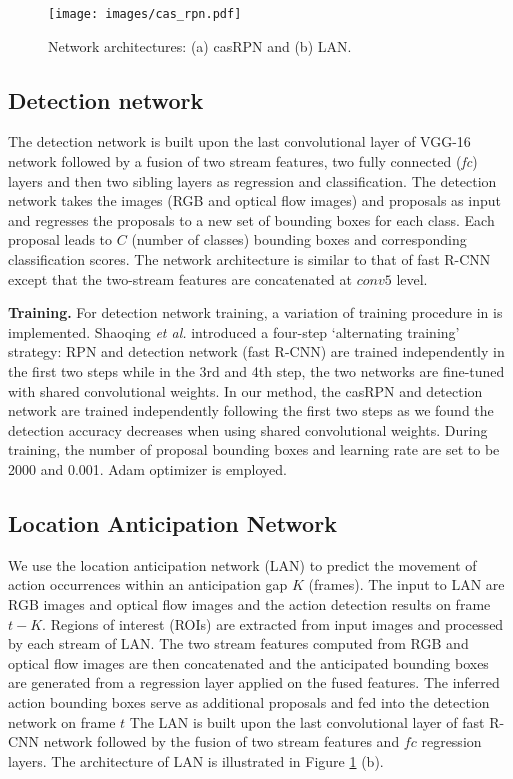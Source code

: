 \documentclass{bmvc2k}
\begin{document}
\begin{figure}
\centering
\texttt{[image: images/cas\_rpn.pdf]}
\caption{Network architectures: (a) casRPN and (b) LAN.}
\label{fig:cas_rpn}
\end{figure}

\subsection{Detection network}
The detection network is built upon the last convolutional layer of VGG-16 network \cite{simonyan2014very} followed by a fusion of two stream features, two fully connected (\textit{fc}) layers and then two sibling layers as regression and classification. The detection network takes the images (RGB and optical flow images) and proposals as input and regresses the proposals to a new set of bounding boxes for each class. Each proposal leads to $C$ (number of classes) bounding boxes and corresponding classification scores. The network architecture is similar to that of fast R-CNN \cite{girshick2015fast} except that the two-stream features are concatenated at $conv5$ level.

\textbf{Training.} For detection network training, a variation of training procedure in \cite{ren2015faster} is implemented. Shaoqing \textit{et al.} \cite{ren2015faster} introduced a four-step `alternating training' strategy: RPN and detection network (fast R-CNN) are trained independently in the first two steps while in the 3rd and 4th step, the two networks are fine-tuned with shared convolutional weights. In our method, the casRPN and detection network are trained independently following the first two steps as we found the detection accuracy decreases when using shared convolutional weights. During training, the number of proposal bounding boxes and learning rate are set to be 2000 and 0.001. Adam optimizer \cite{kingma2014adam} is employed.

\subsection{Location Anticipation Network}
We use the location anticipation network (LAN) to predict the movement of action occurrences within an anticipation gap $K$ (frames). The input to LAN are RGB images and optical flow images and the action detection results on frame $t-K$. Regions of interest (ROIs) are extracted from input images and processed by each stream of LAN. The two stream features computed from RGB and optical flow images are then concatenated and the anticipated bounding boxes are generated from a regression layer applied on the fused features. The inferred action bounding boxes serve as additional proposals and fed into the detection network on frame $t$ 
The LAN is built upon the last convolutional layer of fast R-CNN \cite{girshick2015fast} network followed by the fusion of two stream features and $fc$ regression layers. The architecture of LAN is illustrated in Figure \ref{fig:cas_rpn} (b). 
\end{document}
